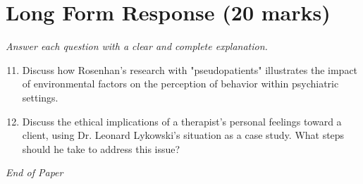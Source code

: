\documentclass[12pt]{article}
\begin{document}
\section*{Long Form Response (20 marks)}
\textit{Answer each question with a clear and complete explanation.}
\begin{enumerate}[label=\arabic*.]
\setcounter{enumi}{10}
\item Discuss how Rosenhan's research with "pseudopatients" illustrates the impact of environmental factors on the perception of behavior within psychiatric settings.
\item Discuss the ethical implications of a therapist's personal feelings toward a client, using Dr. Leonard Lykowski's situation as a case study. What steps should he take to address this issue?
\end{enumerate}

\vfill
\noindent\textit{End of Paper}
\end{document}
